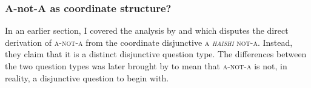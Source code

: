 \documentclass[12pt, UTF8]{article}
\begin{document}
%
%
%
%
%
%
%

\subsubsection{A-not-A as coordinate structure?}

In an earlier section, I covered the analysis by \cite{Huang1991} and \cite{McCawley1994} which disputes the direct derivation of \textsc{a-not-a} from the coordinate disjunctive \textsc{a \textit{haishi} not-a}. Instead, they claim that it is a distinct disjunctive question type. The differences between the two question types was later brought by \cite{Liing2014} to mean that \textsc{a-not-a} is not, in reality, a disjunctive question to begin with.
\end{document}
